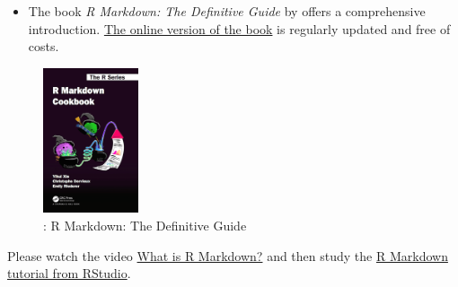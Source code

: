 \documentclass[
  12pt,
  oneside]{book}
\providecommand{\tightlist}{%
  \setlength{\itemsep}{0pt}\setlength{\parskip}{0pt}}
\theoremstyle{definition}
\theoremstyle{definition}
\theoremstyle{definition}
\theoremstyle{definition}
\theoremstyle{remark}
\begin{document}
\begin{itemize}
\tightlist
\item
  The book \emph{R Markdown: The Definitive Guide} by \citet{Xie2018R} offers a comprehensive introduction. \href{https://bookdown.org/yihui/rmarkdown}{The online version of the book} is regularly updated and free of costs.
\end{itemize}

\begin{figure}
\centering
\includegraphics[width=0.25\textwidth,height=\textheight]{fig/rmcb.png}
\caption{\citet{Xie2018R}: R Markdown: The Definitive Guide}
\end{figure}

Please watch the video \href{https://vimeo.com/178485416}{What is R Markdown?} and then study the \href{https://rmarkdown.rstudio.com/lesson-1.html}{R Markdown tutorial from RStudio}.
\end{document}
